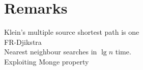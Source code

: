 \section{Remarks}
Klein's multiple source shortest path \cite{klein2005multiple} is one \\
FR-Djikstra \cite{fakcharoenphol2006planar}\\
Nearest neighbour searches in $\lg n$ time. \\
Exploiting Monge property

